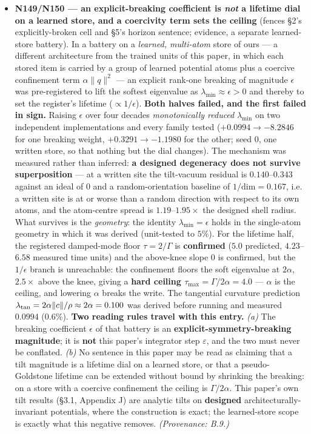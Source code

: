 \documentclass[10pt]{article}
\begin{document}
\begin{itemize}
\item \textbf{N149/N150 --- an explicit-breaking coefficient is \emph{not} a lifetime dial on a learned store, and a coercivity term sets the ceiling} (fences \S2's explicitly-broken cell and \S5's horizon sentence; evidence, a separate learned-store battery). In a battery on a \emph{learned, multi-atom} store of ours --- a different architecture from the trained units of this paper, in which each stored item is carried by a group of learned potential atoms plus a coercive confinement term $\alpha\lVert q\rVert^2$ --- an explicit rank-one breaking of magnitude $\epsilon$ was pre-registered to lift the softest eigenvalue as $\lambda_{\min}\approx\epsilon>0$ and thereby to set the register's lifetime ($\propto1/\epsilon$). \textbf{Both halves failed, and the first failed in sign.} Raising $\epsilon$ over four decades \emph{monotonically reduced} $\lambda_{\min}$ on two independent implementations and every family tested ($+0.0994\to-8.2846$ for one breaking weight, $+0.3291\to-1.1980$ for the other; seed $0$, one written store, so that nothing but the dial changes). The mechanism was measured rather than inferred: \textbf{a designed degeneracy does not survive superposition} --- at a written site the tilt-vacuum residual is $0.140$--$0.343$ against an ideal of $0$ and a random-orientation baseline of $1/\mathrm{dim}=0.167$, i.e. a written site is at or worse than a random direction with respect to its own atoms, and the atom-centre spread is $1.19$--$1.95\times$ the designed shell radius. What survives is the \emph{geometry}: the identity $\lambda_{\min}=\epsilon$ holds in the single-atom geometry in which it was derived (unit-tested to $5\%$). For the lifetime half, the registered damped-mode floor $\tau=2/\Gamma$ is \textbf{confirmed} ($5.0$ predicted, $4.23$--$6.58$ measured time units) and the above-knee slope $0$ is confirmed, but the $1/\epsilon$ branch is unreachable: the confinement floors the soft eigenvalue at $2\alpha$, $2.5\times$ above the knee, giving a \textbf{hard ceiling $\tau_{\max}=\Gamma/2\alpha=4.0$} --- $\alpha$ is the ceiling, and lowering $\alpha$ breaks the write. The tangential curvature prediction $\lambda_{\rm tan}=2\alpha\lVert c\rVert/\rho\approx2\alpha=0.100$ was derived before running and measured $0.0994$ ($0.6\%$). \textbf{Two reading rules travel with this entry.} \emph{(a)} The breaking coefficient $\epsilon$ of that battery is an \textbf{explicit-symmetry-breaking magnitude}; it is \textbf{not} this paper's integrator step $\varepsilon$, and the two must never be conflated. \emph{(b)} No sentence in this paper may be read as claiming that a tilt magnitude is a lifetime dial on a learned store, or that a pseudo-Goldstone lifetime can be extended without bound by shrinking the breaking: on a store with a coercive confinement the ceiling is $\Gamma/2\alpha$. This paper's own tilt results (\S3.1, Appendix J) are analytic tilts on \textbf{designed} architecturally-invariant potentials, where the construction is exact; the learned-store scope is exactly what this negative removes. \emph{(Provenance: B.9.)}


\end{itemize}
\end{document}
